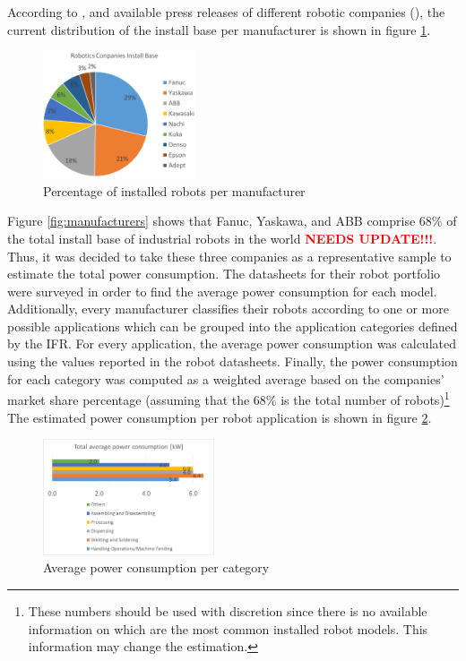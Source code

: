 \begin{appendices}
	According to \cite{montaqim2015}, and available press releases of different robotic companies (\cite{fanuc2015, yaskawa2014, ABB2015}), the current distribution of the install base per manufacturer is shown in figure \ref{fig:manufacturers_pie}.
	\begin{figure}[!ht]
		\centering
		\includegraphics[width=0.4\textwidth]{fig/manufacturers}
		\caption{Percentage of installed robots per manufacturer}
		\label{fig:manufacturers_pie}
	\end{figure}
	Figure \ref{fig:manufacturers} shows that Fanuc, Yaskawa, and ABB comprise 68\% of the total install base of industrial robots in the world \textcolor{red}{\textbf{NEEDS UPDATE!!!}}. Thus, it was decided to take these three companies as a representative sample to estimate the total power consumption. The datasheets for their robot portfolio were surveyed in order to find the average power consumption for each model. Additionally, every manufacturer classifies their robots according to one or more possible applications which can be grouped into the application categories defined by the IFR. For every application, the average power consumption was calculated using the values reported in the robot datasheets. Finally, the power consumption for each category was computed as a weighted average based on the companies' market share percentage (assuming that the 68\% is the total number of robots)\footnote[1]{These numbers should be used with discretion since there is no available information on which are the most common installed robot models. This information may change the estimation.} The estimated power consumption per robot application is shown in figure \ref{fig:average_power}.
	\begin{figure}[h]
		\centering
		\includegraphics[width=0.45\textwidth]{fig/average_power}
		\caption{Average power consumption per category}
		\label{fig:average_power}
	\end{figure}

\end{appendices}
